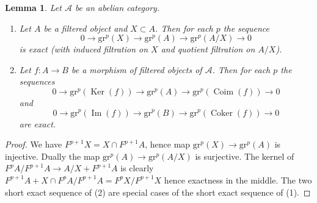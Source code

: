 \documentclass[10pt,a4paper]{amsart}
\theoremstyle{plain}
\newtheorem{lemma}[subsection]{Lemma}
\theoremstyle{definition}
\theoremstyle{remark}
\numberwithin{equation}{subsection}
\def\Ker{\mathop{\mathrm{Ker}}}
\def\Im{\mathop{\mathrm{Im}}}
\def\Coker{\mathop{\mathrm{Coker}}}
\def\Coim{\mathop{\mathrm{Coim}}}
\begin{document}
\begin{lemma}
\label{lemma-ses-gr}
Let $\mathcal{A}$ be an abelian category.
\begin{enumerate}
\item Let $A$ be a filtered object and $X \subset A$. Then for each $p$
the sequence
$$
0 \to \text{gr}^p(X) \to \text{gr}^p(A) \to \text{gr}^p(A/X) \to 0
$$
is exact (with induced filtration on $X$ and quotient filtration on $A/X$).
\item Let $f : A \to B$ be a morphism of filtered objects of $\mathcal{A}$.
Then for each $p$ the sequences
$$
0 \to \text{gr}^p(\Ker(f)) \to \text{gr}^p(A) \to
\text{gr}^p(\Coim(f)) \to 0
$$
and
$$
0 \to \text{gr}^p(\Im(f)) \to \text{gr}^p(B) \to
\text{gr}^p(\Coker(f)) \to 0
$$
are exact.
\end{enumerate}
\end{lemma}

\begin{proof}
We have $F^{p + 1}X = X \cap F^{p + 1}A$, hence map
$\text{gr}^p(X) \to \text{gr}^p(A)$ is injective. Dually the map
$\text{gr}^p(A) \to \text{gr}^p(A/X)$ is surjective.
The kernel of $F^pA/F^{p + 1}A \to A/X + F^{p + 1}A$
is clearly $F^{p + 1}A + X \cap F^pA/F^{p + 1}A = F^pX/F^{p + 1}X$
hence exactness in the middle.
The two short exact sequence of (2) are special cases of the
short exact sequence of (1).
\end{proof}
\end{document}
